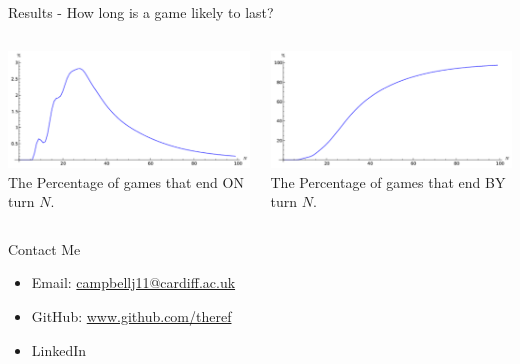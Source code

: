 \documentclass{beamer}
\begin{document}
\begin{frame}{Results - How long is a game likely to last?}
  \begin{columns}
      \begin{center}
      \includegraphics[width=\linewidth]{images/turns}\\
      The Percentage of games that end ON turn $N$.
      \end{center}
      \begin{center}
      \includegraphics[width=\linewidth]{images/sumturns}\\
      The Percentage of games that end BY turn $N$.
      \end{center}
  \end{columns}
\end{frame}

\begin{frame}{Contact Me}
  \begin{itemize}
    \itemsep2em
    \item Email: \href{mailto:campbellj11@cardiff.ac.uk}{campbellj11@cardiff.ac.uk}

    \item GitHub: \href{https://github.com/theref}{www.github.com/theref}

    \item LinkedIn
  \end{itemize}
\end{frame}
\end{document}
